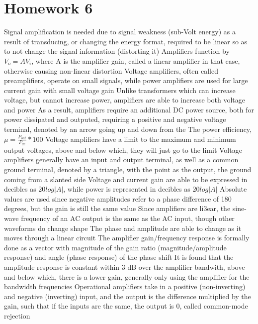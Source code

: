 \documentclass[11 pt, twoside]{article}
\newenvironment{outline*}
{
	\begin{outline}[enumerate]
	}
	{\end{outline}
}
\begin{document}
\section{Homework 6}
\begin{outline*}
\1 Signal amplification is needed due to signal weakness (sub-Volt energy) as a result of transducing, or changing the energy format, required to be linear so as to not change the signal information (distorting it)
	\2 Amplifiers function by $V_o = AV_i$, where A is the amplifier gain, called a linear amplifier in that case, otherwise causing non-linear distortion
	\2 Voltage amplifiers, often called preamplifiers, operate on small signals, while power amplifiers are used for large current gain with small voltage gain
		\3 Unlike transformers which can increase voltage, but cannot increase power, amplifiers are able to increase both voltage and power
		\3 As a result, amplifiers require an additional DC power source, both for power dissipated and outputed, requiring a positive and negative voltage terminal, denoted by an arrow going up and down from the 
			\4 The power efficiency, $\mu = \frac{P_{out}}{P_{dc}} * 100$
	\2 Voltage amplifiers have a limit to the maximum and minimum output voltages, above and below which, they will just go to the limit
\1 Voltage amplifiers generally have an input and output terminal, as well as a common ground terminal, denoted by a triangle, with the point as the output, the ground coming from a slanted side
\1 Voltage and current gain are able to be expressed in decibles as $20log|A|$, while power is represented in decibles as $20log|A|$
	\2 Absolute values are used since negative amplitudes refer to a phase difference of 180 degrees, but the gain is still the same value
\1 Since amplifiers are li3ear, the sine-wave frequency of an AC output is the same as the AC input, though other waveforms do change shape
	\2 The phase and amplitude are able to change as it moves through a linear circuit
	\2 The amplifier gain/frequency response is formally done as a vector with magnitude of the gain ratio (magnitude/amplitude response) and angle (phase response) of the phase shift
		\3 It is found that the amplitude response is constant within 3 dB over the amplifier bandwith, above and below which, there is a lower gain, generally only using the amplifier for the bandwidth frequencies
\1 Operational amplifiers take in a positive (non-inverting) and negative (inverting) input, and the output is the difference multiplied by the gain, such that if the inputs are the same, the output is 0, called common-mode rejection

\end{outline*}
\end{document}
